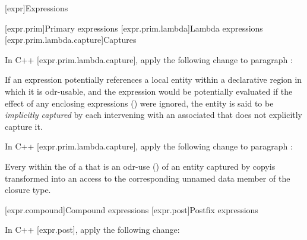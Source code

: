 [expr]{Expressions}

\setcounter{section}{3}
[expr.prim]{Primary expressions}
\setcounter{subsection}{4}
[expr.prim.lambda]{Lambda expressions}
\setcounter{subsubsection}{1}
[expr.prim.lambda.capture]{Captures}

\pnum
In C++ [expr.prim.lambda.capture], apply the following change to paragraph :
\begin{std.txt}
If an expression potentially references a local entity within a declarative
region in which it is odr-usable, and the expression would be potentially
evaluated if the effect of any enclosing  expressions
()  were ignored, the entity is said to be
\emph{implicitly captured} by each intervening 
with an associated  that does not explicitly
capture it.
\end{std.txt}

\pnum
In C++ [expr.prim.lambda.capture], apply the following change to paragraph :
\begin{std.txt}
Every  within the  of
a  that is an odr-use () of
an entity captured by copyis transformed into an access to the
corresponding unnamed data member of the closure type.
\end{std.txt}

[expr.compound]{Compound expressions}
[expr.post]{Postfix expressions}

\pnum
In C++ [expr.post], apply the following change:

